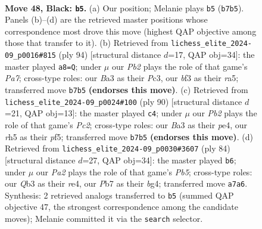 \documentclass[11pt]{article}
\begin{document}
\clearpage

\begin{figure}[p]\centering
\begin{subfigure}{0.46\textwidth}\centering
\resizebox{\linewidth}{!}{%
\newchessgame
\chessboard[
  setfen={8/pp4k1/8/5P1R/8/bq3BK1/8/8 b - - 0 48},
  showmover=false,
  pgfstyle=straightmove, color=movearrow, markmove={b7-b5}
]}
\caption{}
\end{subfigure}\hfill
\begin{subfigure}{0.46\textwidth}\centering
\resizebox{\linewidth}{!}{%
\newchessgame
\chessboard[
  setfen={8/PQ2bk1p/7P/r5p1/8/2P5/6K1/8 w - - 0 48},
  showmover=false,
  pgfstyle=straightmove, color=movearrow, markmove={a7-a8}
]}
\caption{}
\end{subfigure}
\\[4pt]
\begin{subfigure}{0.46\textwidth}\centering
\resizebox{\linewidth}{!}{%
\newchessgame
\chessboard[
  setfen={1kbQ4/8/6r1/5p2/4p3/8/2P3P1/3K4 w - - 7 46},
  showmover=false,
  pgfstyle=straightmove, color=movearrow, markmove={c2-c4}
]}
\caption{}
\end{subfigure}\hfill
\begin{subfigure}{0.46\textwidth}\centering
\resizebox{\linewidth}{!}{%
\newchessgame
\chessboard[
  setfen={8/8/3Qp1k1/1P2P1p1/4r1b1/8/3K4/8 w - - 1 43},
  showmover=false,
  pgfstyle=straightmove, color=movearrow, markmove={b5-b6}
]}
\caption{}
\end{subfigure}
\caption{\textbf{Move 48, Black: \texttt{b5}.} (a) Our position; Melanie plays \texttt{b5} (\texttt{b7b5}). Panels (b)--(d) are the retrieved master positions whose correspondence most drove this move (highest QAP objective among those that transfer to it). (b) Retrieved from \texttt{lichess\_elite\_2024-09\_p0016\#815} (ply 94) [structural distance $d$=17, QAP obj=34]: the master played \texttt{a8=Q}; under $\mu$ our \emph{Pb2} plays the role of that game's \emph{Pa7}; cross-type roles: our \emph{B}a3 as their \emph{P}c3, our \emph{b}f3 as their \emph{r}a5; transferred move \texttt{b7b5} \textbf{(endorses this move)}. (c) Retrieved from \texttt{lichess\_elite\_2024-09\_p0024\#100} (ply 90) [structural distance $d$=21, QAP obj=13]: the master played \texttt{c4}; under $\mu$ our \emph{Pb2} plays the role of that game's \emph{Pc2}; cross-type roles: our \emph{B}a3 as their \emph{p}e4, our \emph{r}h5 as their \emph{p}f5; transferred move \texttt{b7b5} \textbf{(endorses this move)}. (d) Retrieved from \texttt{lichess\_elite\_2024-09\_p0030\#3607} (ply 84) [structural distance $d$=27, QAP obj=34]: the master played \texttt{b6}; under $\mu$ our \emph{Pa2} plays the role of that game's \emph{Pb5}; cross-type roles: our \emph{Q}b3 as their \emph{r}e4, our \emph{P}b7 as their \emph{b}g4; transferred move \texttt{a7a6}. Synthesis: 2 retrieved analogs transferred to \texttt{b5} (summed QAP objective 47, the strongest correspondence among the candidate moves); Melanie committed it via the \texttt{search} selector.}
\label{fig:thought-m95}
\end{figure}
\end{document}
